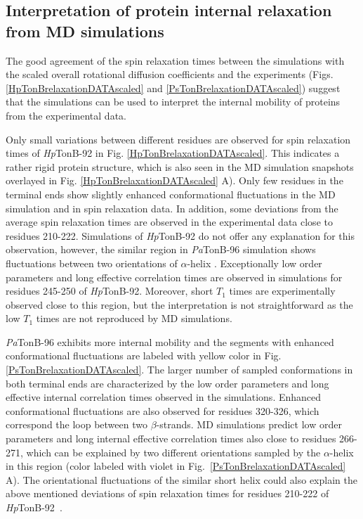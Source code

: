 \documentclass[journal=jpcbfk,manuscript=article]{achemso}
\begin{document}
\subsection{Interpretation of protein internal relaxation from MD simulations}
The good agreement of the spin relaxation times between the simulations
with the scaled overall rotational diffusion coefficients and
the experiments (Figs. \ref{HpTonBrelaxationDATAscaled} and \ref{PsTonBrelaxationDATAscaled})
suggest that the simulations can be used to interpret the internal
mobility of proteins from the experimental data.

Only small variations between different residues are observed
for spin relaxation times of {\it Hp}TonB-92 in Fig. \ref{HpTonBrelaxationDATAscaled}.
This indicates a rather rigid protein structure, which is also seen in
the MD simulation snapshots overlayed in Fig. \ref{HpTonBrelaxationDATAscaled} A).
Only few residues in the terminal ends show slightly
enhanced conformational fluctuations in the MD simulation and in
spin relaxation data. In addition, some deviations from the average spin relaxation times
are observed in the experimental data close to residues 210-222.
Simulations of {\it Hp}TonB-92 do not offer any explanation for this
observation, however, the similar region in {\it Pa}TonB-96 simulation shows 
fluctuations between two orientations of $\alpha$-helix \cite{oeemig17}.
Exceptionally low order parameters and long effective correlation times 
are observed in simulations for residues 245-250 of {\it Hp}TonB-92.
Moreover, short $T_1$ times are experimentally observed close to this region,
but the interpretation is not straightforward as the low $T_1$ times
are not reproduced by MD simulations.

{\it Pa}TonB-96 exhibits more internal mobility 
and the segments with enhanced conformational fluctuations are labeled with yellow color
in Fig. \ref{PsTonBrelaxationDATAscaled}.
The larger number of sampled conformations in both terminal ends
are characterized by the low order parameters and long effective internal correlation times
observed in the simulations. 
Enhanced conformational fluctuations are also observed for residues 320-326,
which correspond the loop between two $\beta$-strands.
MD simulations predict low order parameters and long internal effective correlation
times also close to residues 266-271, which can be explained by  
two different orientations sampled by the $\alpha$-helix in this region
(color labeled with violet in Fig.~\ref{PsTonBrelaxationDATAscaled} A).
The orientational fluctuations of the similar short helix could also explain the above mentioned
deviations of spin relaxation times for residues 210-222 of {\it Hp}TonB-92~\cite{ciragan16}.
\end{document}

